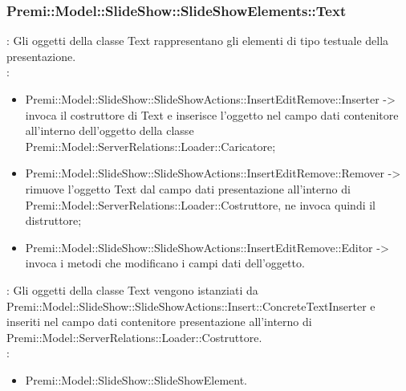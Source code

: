 {     \subsubsection{Premi::Model::SlideShow::SlideShowElements::Text}{
				\textbf{\tipo}: Gli oggetti della classe Text rappresentano gli elementi di tipo testuale della presentazione.\\
				\textbf{\relaz}: 
				\begin{itemize}
					\item Premi::Model::SlideShow::SlideShowActions::InsertEditRemove::Inserter -> invoca il costruttore di Text e inserisce l’oggetto nel campo dati contenitore all’interno dell’oggetto della classe Premi::Model::ServerRelations::Loader::Caricatore;
                    \item Premi::Model::SlideShow::SlideShowActions::InsertEditRemove::Remover -> rimuove l’oggetto Text dal campo dati presentazione all’interno di Premi::Model::ServerRelations::Loader::Costruttore, ne invoca quindi il distruttore;
                    \item Premi::Model::SlideShow::SlideShowActions::InsertEditRemove::Editor -> invoca i metodi che modificano i campi dati dell'oggetto.
				\end{itemize}	
                \textbf{\interfacce}: Gli oggetti della classe Text vengono istanziati da Premi::Model::SlideShow::SlideShowActions::Insert::ConcreteTextInserter e inseriti nel campo dati contenitore presentazione all’interno di Premi::Model::ServerRelations::Loader::Costruttore.\\
                \textbf{\base}: 
                    \begin{itemize}
                    \item Premi::Model::SlideShow::SlideShowElement.
                    \end{itemize}
                    }
}
